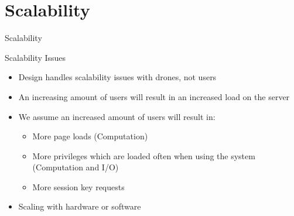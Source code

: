 \author{Esben Pilgaard Møller}

\section{Scalability}
\begin{frame}{Scalability}{}
\begin{block}{Scalability Issues}
  \begin{itemize}
  	\item Design handles scalability issues with drones, not users
    \item An increasing amount of users will result in an increased load on the server
    \item We assume an increased amount of users will result in:
    \begin{itemize}
			\item More page loads (Computation)
			\item More privileges which are loaded often when using the system (Computation and I/O)
			\item More session key requests
		\end{itemize}
		\item Scaling with hardware or software
  \end{itemize}
\end{block}
\end{frame}


